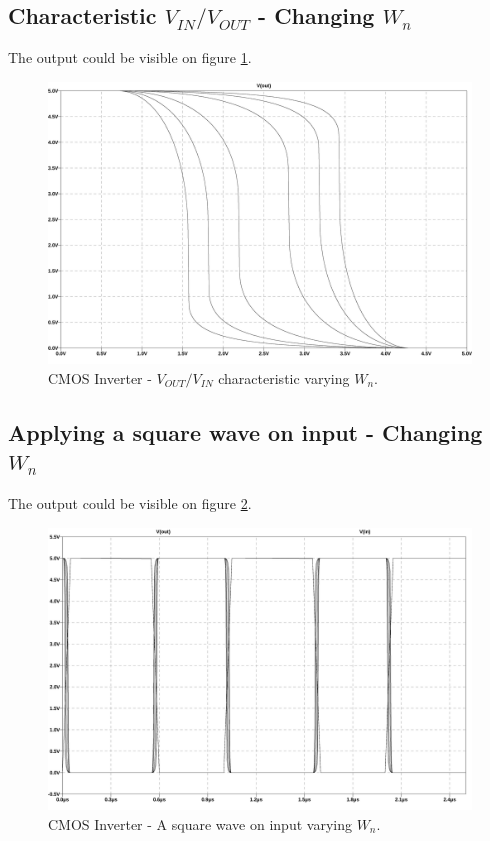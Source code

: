 \subsection{Characteristic $V_{IN}/V_{OUT}$ - Changing $W_n$}

The output could be visible on figure \ref{characteristicCWn}.
\begin{figure}[h]
  \centering
  \includegraphics[width=14cm]{graph/CMOSInverter/CharacteristicCWn.jpg}
  \caption{CMOS Inverter - $V_{OUT}/V_{IN}$ characteristic varying $W_n$.}
  \label{characteristicCWn}
\end{figure}

\subsection{Applying a square wave on input - Changing $W_n$}

The output could be visible on figure \ref{SquareWaveCWn}.
\begin{figure}[h]
  \centering
  \includegraphics[width=14cm]{graph/CMOSInverter/SquareWaveCWn.jpg}
  \caption{CMOS Inverter - A square wave on input varying $W_n$.}
  \label{SquareWaveCWn}
\end{figure}